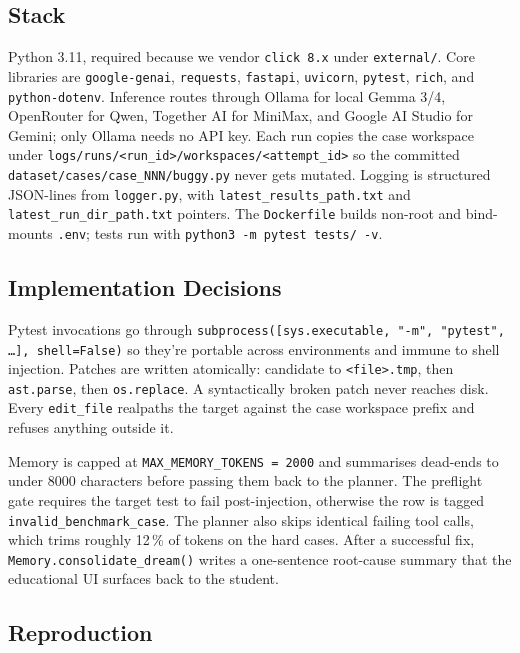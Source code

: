 \documentclass[11pt,letterpaper]{article}
\begin{document}
\subsection{Stack}

Python 3.11, required because we vendor \texttt{click 8.x} under \texttt{external/}. Core libraries are \texttt{google-genai}, \texttt{requests}, \texttt{fastapi}, \texttt{uvicorn}, \texttt{pytest}, \texttt{rich}, and \texttt{python-dotenv}. Inference routes through Ollama for local Gemma 3/4, OpenRouter for Qwen, Together AI for MiniMax, and Google AI Studio for Gemini; only Ollama needs no API key. Each run copies the case workspace under \texttt{logs/runs/<run\_id>/workspaces/<attempt\_id>} so the committed \texttt{dataset/cases/case\_NNN/buggy.py} never gets mutated. Logging is structured JSON-lines from \texttt{logger.py}, with \texttt{latest\_results\_path.txt} and \texttt{latest\_run\_dir\_path.txt} pointers. The \texttt{Dockerfile} builds non-root and bind-mounts \texttt{.env}; tests run with \texttt{python3 -m pytest tests/ -v}.

\subsection{Implementation Decisions}

Pytest invocations go through \texttt{subprocess([sys.executable, "-m", "pytest", \ldots], shell=False)} so they're portable across environments and immune to shell injection. Patches are written atomically: candidate to \texttt{<file>.tmp}, then \texttt{ast.parse}, then \texttt{os.replace}. A syntactically broken patch never reaches disk. Every \texttt{edit\_file} realpaths the target against the case workspace prefix and refuses anything outside it.

Memory is capped at \texttt{MAX\_MEMORY\_TOKENS = 2000} and summarises dead-ends to under 8000 characters before passing them back to the planner. The preflight gate requires the target test to fail post-injection, otherwise the row is tagged \texttt{invalid\_benchmark\_case}. The planner also skips identical failing tool calls, which trims roughly 12\,\% of tokens on the hard cases. After a successful fix, \texttt{Memory.consolidate\_dream()} writes a one-sentence root-cause summary that the educational UI surfaces back to the student.

\subsection{Reproduction}
\end{document}
